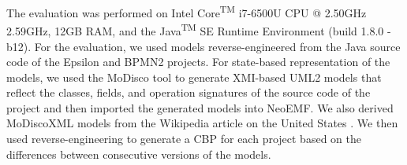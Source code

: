 
The evaluation was performed on Intel\textsuperscript{\textregistered} Core\textsuperscript{TM} i7-6500U CPU @ 2.50GHz 2.59GHz, 12GB RAM, and the Java\textsuperscript{TM} SE Runtime Environment (build 1.8.0 -b12). For the evaluation, we used models reverse-engineered from the Java source code of the Epsilon \cite{eclipse2017epsilon,eclipse2018epsilongit} and BPMN2 \cite{eclipse2017bpmn2} projects. For state-based representation of the models, we used the MoDisco tool \cite{DBLP:journals/infsof/BruneliereCDM14} to generate XMI-based UML2 \cite{eclipse2017uml2} models that reflect the classes, fields, and operation signatures of the source code of the project and then imported the generated models into NeoEMF. We also derived MoDiscoXML models \cite{eclipse2018modiscoxml} from the Wikipedia article on the United States \cite{wikipedia2018us}. We then used reverse-engineering to generate a CBP for each project based on the differences between consecutive versions of the models.

